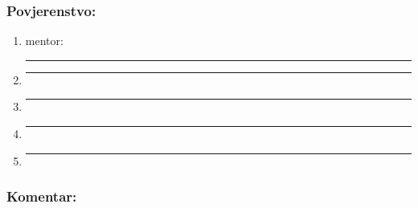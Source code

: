   \subsubsection*{Povjerenstvo:}

    \settowidth{\mytextwidth}{mentor: }

    \setlength{\myline}{\mytextwidth}

    \begin{enumerate}
      \item mentor: \rule{6.5cm}{0.5pt}
      \item \rule{\myline+6.5cm}{0.5pt}
      \item \rule{\myline+6.5cm}{0.5pt}
      \item \rule{\myline+6.5cm}{0.5pt}
      \item \rule{\myline+6.5cm}{0.5pt}
    \end{enumerate}

  \subsubsection*{Komentar:}

    \framebox[\textwidth][c]{\rule{0pt}{4.1cm}}
